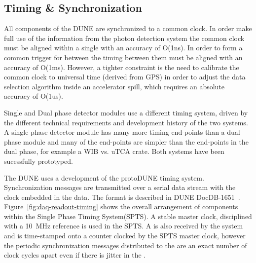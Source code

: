 \subsection{Timing \& Synchronization}
\label{sec:fd-daq-timing}



All components of the DUNE   are
synchronized to a common clock.  In order make full use of the
information from the photon detection system the common clock must be
aligned within a single  with an accuracy of O(1ns).
In order to form a common trigger for  between
 the timing between them must be aligned with an
accuracy of O(1ms).  However, a tighter constraint is the need to
calibrate the common clock to universal time (derived from GPS) in
order to adjust the data selection algorithm inside an accelerator
spill, which requires an absolute accuracy of O(1us).

Single and Dual phase detector modules use a different timing system,
driven by the different technical requirements and development history
of the two systems. A single phase detector module has many more
timing end-points than a dual phase module and many of the end-points
are simpler than the end-points in the dual phase, for example a WIB
vs. uTCA crate. Both systems have been sucessfully prototyped.

The DUNE   uses a development of the protoDUNE
timing system. Synchronization messages are transmitted over a serial
data stream with the clock embedded in the data. The format is
described in DUNE DocDB-1651~\cite{docdb-1651}. Figure~\ref{fig:daq-readout-timing}
shows the overall arrangement of components within the Single Phase
Timing System(SPTS). A stable master clock, disciplined with a \SI{10}{\MHz}
reference is used in the SPTS. A  is
also received by the system and is time-stamped onto a counter clocked
by the SPTS master clock, however the periodic synchronization
messages distributed to the   are an exact number
of clock cycles apart even if there is jitter in the .

